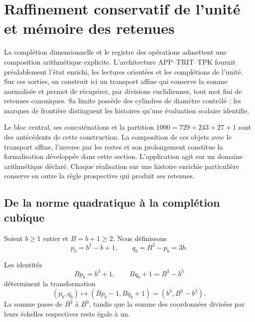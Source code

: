 \section{Raffinement conservatif de l’unité et mémoire des retenues}
\label{lib03:refinamiento}

La complétion dimensionnelle et le registre des opérations admettent une composition arithmétique explicite. L'architecture APP--TRIT--TPK fournit préalablement l'état enrichi, les lectures orientées et les complétions de l'unité. Sur ces sorties, on construit ici un transport affine qui conserve la somme normalisée et permet de récupérer, par divisions euclidiennes, tout mot fini de retenues canoniques. Sa limite possède des cylindres de diamètre contrôlé ; les marques de frontière distinguent les histoires qu'une évaluation scalaire identifie.

Le bloc central, ses concaténations et la partition
\(1000=729+243+27+1\) sont des antécédents de cette construction. La composition
de ces objets avec le transport affine, l’inverse par les restes et son
prolongement constitue la formalisation développée dans cette section.
L’application agit sur un domaine arithmétique déclaré. Chaque réalisation
sur une histoire enrichie particulière conserve en outre la règle
prospective qui produit ses retenues.

\subsection{De la norme quadratique à la complétion cubique}
\label{lib03:completacion}

Soient \(b\geq1\) entier et \(B=b+1\geq2\). Nous définissons
\begin{equation}
 p_b=b^2-b+1,\qquad q_b=B^2-p_b=3b.
 \label{lib03:pb}
\end{equation}

\begin{proposition}
\label{lib03:prop-completacion}
Les identités
\begin{equation}
 Bp_b=b^3+1,\qquad Bq_b+1=B^3-b^3
 \label{lib03:cuadratica-cubica}
\end{equation}
déterminent la transformation
\begin{equation}
 (p_b,q_b)\longmapsto(Bp_b-1,Bq_b+1)
       =(b^3,B^3-b^3).
 \label{lib03:transferencia-cubica}
\end{equation}
La somme passe de \(B^2\) à \(B^3\), tandis que la somme des
coordonnées divisées par leurs échelles respectives reste égale à un.
\end{proposition}

